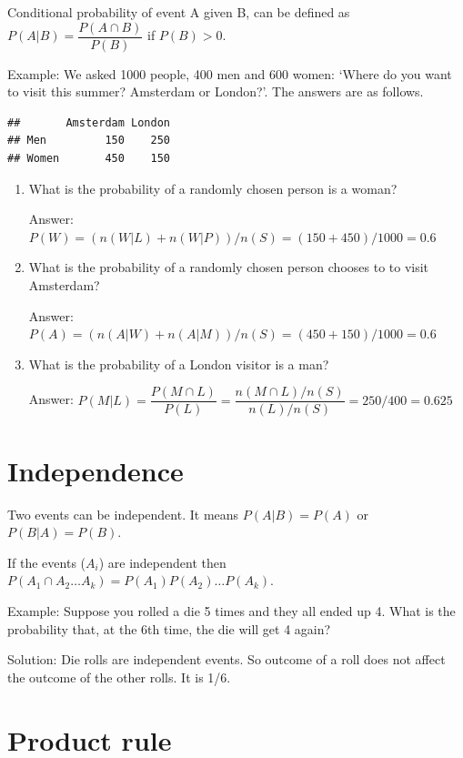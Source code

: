 \documentclass[]{book}
\theoremstyle{definition}
\theoremstyle{definition}
\theoremstyle{definition}
\theoremstyle{remark}
\begin{document}
Conditional probability of event A given B, can be defined as
\(P(A|B)=\dfrac{P(A \cap B)}{P(B)}\) if \(P(B) > 0\).

Example: We asked 1000 people, 400 men and 600 women: `Where do you want
to visit this summer? Amsterdam or London?'. The answers are as follows.

\begin{verbatim}
##       Amsterdam London
## Men         150    250
## Women       450    150
\end{verbatim}

\begin{enumerate}
\def\labelenumi{\alph{enumi}.}
\item
  What is the probability of a randomly chosen person is a woman?

  Answer: \(P(W) = (n(W|L) + n(W|P))/n(S) = (150 + 450)/1000 = 0.6\)
\item
  What is the probability of a randomly chosen person chooses to to
  visit Amsterdam?

  Answer: \(P(A) = (n(A|W) + n(A|M))/n(S) = (450 + 150)/1000 = 0.6\)
\item
  What is the probability of a London visitor is a man?

  Answer:
  \(P(M|L) = \dfrac{P(M\cap L)}{P(L)} = \dfrac{n(M\cap L)/n(S)}{n(L)/n(S)} = 250/400 = 0.625\)
\end{enumerate}

\hypertarget{independence}{%
\section{Independence}\label{independence}}

Two events can be independent. It means \(P(A|B) = P(A)\) or
\(P(B|A) = P(B)\).

If the events (\(A_i\)) are independent then
\(P(A_1 \cap A_2 \dots A_k) = P(A_1)P(A_2)\dots P(A_k)\).

Example: Suppose you rolled a die 5 times and they all ended up 4. What
is the probability that, at the 6th time, the die will get 4 again?

Solution: Die rolls are independent events. So outcome of a roll does
not affect the outcome of the other rolls. It is 1/6.

\hypertarget{product-rule}{%
\section{Product rule}\label{product-rule}}
\end{document}
